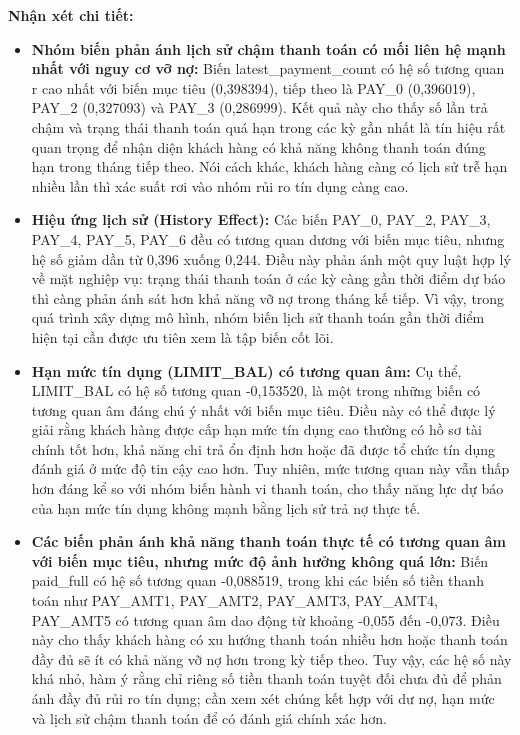 \textbf{Nhận xét chi tiết:}
\begin{itemize}
    \item \textbf{Nhóm biến phản ánh lịch sử chậm thanh toán có mối liên hệ mạnh nhất với nguy cơ vỡ nợ: } Biến latest\_payment\_count có hệ số tương quan r cao nhất với biến mục tiêu (0,398394), tiếp theo là PAY\_0 (0,396019), PAY\_2 (0,327093) và PAY\_3 (0,286999). Kết quả này cho thấy số lần trả chậm và trạng thái thanh toán quá hạn trong các kỳ gần nhất là tín hiệu rất quan trọng để nhận diện khách hàng có khả năng không thanh toán đúng hạn trong tháng tiếp theo. Nói cách khác, khách hàng càng có lịch sử trễ hạn nhiều lần thì xác suất rơi vào nhóm rủi ro tín dụng càng cao.
    \item \textbf{Hiệu ứng lịch sử (History Effect):} Các biến PAY\_0, PAY\_2, PAY\_3, PAY\_4, PAY\_5, PAY\_6 đều có tương quan dương với biến mục tiêu, nhưng hệ số giảm dần từ 0,396 xuống 0,244. Điều này phản ánh một quy luật hợp lý về mặt nghiệp vụ: trạng thái thanh toán ở các kỳ càng gần thời điểm dự báo thì càng phản ánh sát hơn khả năng vỡ nợ trong tháng kế tiếp. Vì vậy, trong quá trình xây dựng mô hình, nhóm biến lịch sử thanh toán gần thời điểm hiện tại cần được ưu tiên xem là tập biến cốt lõi.
    \item \textbf{Hạn mức tín dụng (LIMIT\_BAL) có tương quan âm:} Cụ thể, LIMIT\_BAL có hệ số tương quan -0,153520, là một trong những biến có tương quan âm đáng chú ý nhất với biến mục tiêu. Điều này có thể được lý giải rằng khách hàng được cấp hạn mức tín dụng cao thường có hồ sơ tài chính tốt hơn, khả năng chi trả ổn định hơn hoặc đã được tổ chức tín dụng đánh giá ở mức độ tin cậy cao hơn. Tuy nhiên, mức tương quan này vẫn thấp hơn đáng kể so với nhóm biến hành vi thanh toán, cho thấy năng lực dự báo của hạn mức tín dụng không mạnh bằng lịch sử trả nợ thực tế.
    \item \textbf{Các biến phản ánh khả năng thanh toán thực tế có tương quan âm với biến mục tiêu, nhưng mức độ ảnh hưởng không quá lớn:} Biến paid\_full có hệ số tương quan -0,088519, trong khi các biến số tiền thanh toán như PAY\_AMT1, PAY\_AMT2, PAY\_AMT3, PAY\_AMT4, PAY\_AMT5 có tương quan âm dao động từ khoảng -0,055 đến -0,073. Điều này cho thấy khách hàng có xu hướng thanh toán nhiều hơn hoặc thanh toán đầy đủ sẽ ít có khả năng vỡ nợ hơn trong kỳ tiếp theo. Tuy vậy, các hệ số này khá nhỏ, hàm ý rằng chỉ riêng số tiền thanh toán tuyệt đối chưa đủ để phản ánh đầy đủ rủi ro tín dụng; cần xem xét chúng kết hợp với dư nợ, hạn mức và lịch sử chậm thanh toán để có đánh giá chính xác hơn.
\end{itemize}

